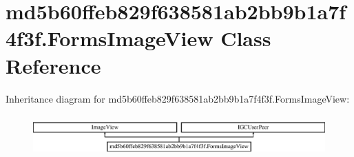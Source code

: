 \hypertarget{classmd5b60ffeb829f638581ab2bb9b1a7f4f3f_1_1FormsImageView}{}\section{md5b60ffeb829f638581ab2bb9b1a7f4f3f.\+Forms\+Image\+View Class Reference}
\label{classmd5b60ffeb829f638581ab2bb9b1a7f4f3f_1_1FormsImageView}
Inheritance diagram for md5b60ffeb829f638581ab2bb9b1a7f4f3f.\+Forms\+Image\+View\+:\begin{figure}[H]
\begin{center}
\leavevmode
\includegraphics[height=1.604584cm]{classmd5b60ffeb829f638581ab2bb9b1a7f4f3f_1_1FormsImageView}
\end{center}
\end{figure}
